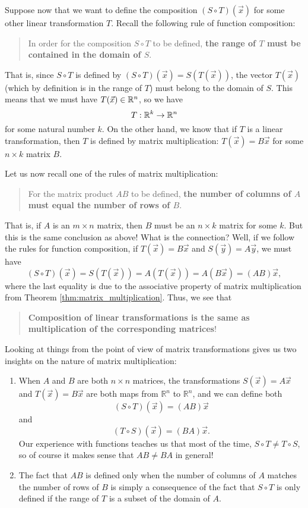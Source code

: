 Suppose now that we want to define the composition $(S\circ T)(\vec x)$ for some other linear transformation $T$. Recall the following rule of function composition:
\begin{quote}
In order for the composition $S\circ T$ to be defined, \textbf{the range of $T$ must be contained in the domain of $S$}.
\end{quote}
That is, since $S\circ T$ is defined by $(S\circ T)(\vec x) = S(T(\vec x))$, the vector $T(\vec x)$ (which by definition is in the range of $T$) must belong to the domain of $S$. This means that we must have $T(\vec x)\in \mathbb{R}^n$, so we have
\[
T:\mathbb{R}^k\to \mathbb{R}^n
\]
for some natural number $k$. On the other hand, we know that if $T$ is a linear transformation, then $T$ is defined by matrix multiplication: $T(\vec x) = B\vec x$ for some $n\times k$ matrix $B$.


Let us now recall one of the rules of matrix multiplication:

\begin{quote}
For the matrix product $AB$ to be defined, \textbf{the number of columns of $A$ must equal the number of rows of $B$}.
\end{quote}

That is, if $A$ is an $m\times n$ matrix, then $B$ must be an $n\times k$ matrix for some $k$. But this is the same conclusion as above! What is the connection? Well, if we follow the rules for function composition, if $T(\vec x) = B\vec x$ and $S(\vec y) = A\vec y$, we must have
\[
(S\circ T)(\vec x) = S(T(\vec x)) = A(T(\vec x)) = A(B\vec x) = (AB)\vec x,
\]
where the last equality is due to the associative property of matrix multiplication from Theorem \ref{thm:matrix_multiplication}. Thus, we see that
\begin{quote}
\textbf{Composition of linear transformations is the same as multiplication of the corresponding matrices}!
\end{quote}

Looking at things from the point of view of matrix transformations gives us two insights on the nature of matrix multiplication:
\begin{enumerate}
\item When $A$ and $B$ are both $n\times n$ matrices, the transformations $S(\vec x) = A\vec x$ and $T(\vec x) = B\vec x$ are both maps from $\mathbb{R}^n$ to $\mathbb{R}^n$, and we can define both
\[
(S\circ T)(\vec x) = (AB)\vec x
\]
and
\[
(T\circ S)(\vec x) = (BA)\vec x.
\]
Our experience with functions teaches us that most of the time, $S\circ T \neq T\circ S$, so of course it makes sense that $AB\neq BA$ in general!

\item The fact that $AB$ is defined only when the number of columns of $A$ matches the number of rows of $B$ is simply a consequence of the fact that $S\circ T$ is only defined if the range of $T$ is a subset of the domain of $A$.
\end{enumerate}

